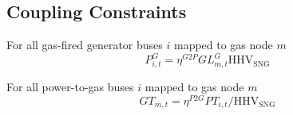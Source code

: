 \subsection{Coupling Constraints}

For all gas-fired generator buses $i$ mapped to gas node $m$ \atallt{}
\begin{equation}
  P^G_{i,t} = \eta^{G2P} GL^G_{m,t} \text{HHV}_{\text{SNG}}
\end{equation}

For all power-to-gas buses $i$ mapped to gas node $m$ \atallt{}
\begin{equation}
  GT_{m,t} =  \eta^{P2G} PT_{i,t} /\text{HHV}_\text{SNG}
\end{equation}
